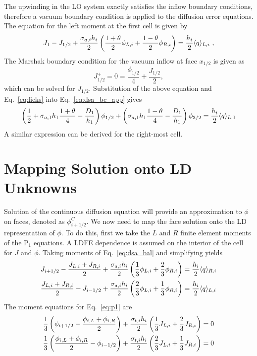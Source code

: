 The upwinding in the LO system exactly satisfies the inflow boundary conditions, therefore
a vacuum boundary condition is applied to the diffusion error equations.  The equation for the left moment
at the first cell is given by
\begin{equation}\label{eq:dsa_bc_app}
    J_{1} - J_{1/2}  + \frac{\sigma_{a,i}h_i}{2} \left(\frac{1+\theta}{2} \phi_{L,i}
    + \frac{1-\theta}{2}
    \phi_{R,i} \right) = \frac{h_i}{2} \langle q \rangle_{L,i}\,\,,
\end{equation}
The Marshak boundary condition for the vacuum inflow at face $x_{1/2}$ is given as
\begin{equation}
    J^+_{1/2} = 0 = \frac{\phi_{1/2}}{4} + \frac{J_{1/2}}{2},
\end{equation}
which can be solved for $J_{1/2}$.  Substitution of the above equation and
Eq.~\eqref{eq:ficks} into Eq.~\eqref{eq:dsa_bc_app} gives 
\begin{equation}\label{eq:bc_dsa_app}
    \left(\frac{1}{2}+ \sigma_{a,1}h_1\frac{1+\theta}{4} - \frac{D_1}{h_1}\right)\phi_{1/2} +
    \left( {\sigma_{a,1}{h_1}}\frac{1-\theta}{4} - \frac{D_1}{h_1}  \right)\phi_{3/2} =
    \frac{h_i}{2} \langle q \rangle_{L,1}
\end{equation}
A similar expression can be derived for the right-most cell.

\section{Mapping Solution onto LD Unknowns}

Solution of the continuous diffusion equation will provide an approximation to $\phi$ on
faces, denoted as $\phi_{i+1/2}^C$. We now need to map the face solution onto 
the LD representation of $\phi$. To do this, first we take the $L$ and $R$ finite element moments of the P$_1$
equations.  A LDFE dependence is assumed on the interior of the cell for $J$ and
$\phi$.  Taking moments of Eq.~\eqref{eq:dsa_bal} and simplifying yields
\begin{align}
    J_{{i+1/2}} - \frac{J_{L,i} + J_{R,i}}{2} + \frac{\sigma_{a,i} h_i}{2} \left(\frac{1}{3} \phi_{L,i} +
    \frac{2}{3}\phi_{R,i}\right) &= \frac{h_i}{2} \langle q \rangle_{R,i} \\
    \frac{J_{L,i} + J_{R,i}}{2} - J_{i-1/2} + \frac{\sigma_{a,i} h_i}{2}
    \left(\frac{2}{3} \phi_{L,i} +
    \frac{1}{3}\phi_{R,i}\right) &= \frac{h_i}{2} \langle q \rangle_{L,i}
\end{align}
The moment equations for Eq.~\eqref{eq:p1} are
\begin{align}
    \frac{1}{3}\left(\phi_{{i+1/2}} - \frac{\phi_{i,L} + \phi_{i,R}}{2}\right) +
    \frac{\sigma_{t,i} h_i}{2} \left(\frac{1}{3} J_{L,i} + \frac{2}{3}J_{R,i}\right)
    &= 0 \\
    \frac{1}{3}\left(\frac{\phi_{i,L} + \phi_{i,R}}{2} - \phi_{i-1/2} \right) +
    \frac{\sigma_{t,i} h_i}{2} \left(\frac{2}{3} J_{L,i} + \frac{1}{3}J_{R,i}\right)
    &= 0 
\end{align}

